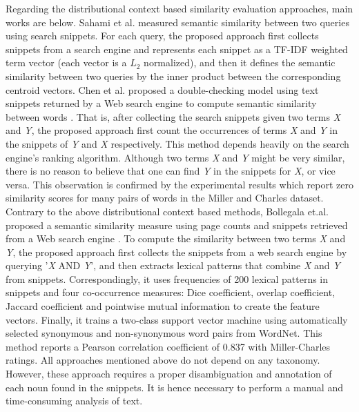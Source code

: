 Regarding the distributional context based similarity evaluation approaches, main works are below. Sahami et al. measured semantic similarity between
two queries using search snippets\cite{Sahami:2006}. For each query, the proposed approach first collects snippets from
a search engine and represents each snippet as a TF-IDF weighted term vector (each vector is a $L_{2}$ normalized), and then it defines the semantic
similarity between two queries by the inner product between the corresponding centroid vectors.
Chen et al. proposed a double-checking model using
text snippets returned by a Web search engine to compute
semantic similarity between words \cite{Chen:2006}. That is, after collecting the search snippets given two terms \emph{X} and \emph{Y},
the proposed approach first count the occurrences of terms \emph{X} and \emph{Y} in the
snippets of \emph{Y} and \emph{X} respectively. {\color{red}This method
depends heavily on the search engine's ranking algorithm.
Although two terms \emph{X} and \emph{Y} might be very similar, there
is no reason to believe that one can find \emph{Y} in the snippets for
\emph{X}, or vice versa. This observation is confirmed by the experimental results which report zero similarity
scores for many pairs of words in the Miller and Charles dataset\cite{Miller:1998}.}
Contrary to the above distributional context based methods, Bollegala et.al. proposed a semantic similarity measure using
page counts and snippets retrieved from a Web
search engine \cite{Bollegala:2007}\cite{Bollegala:2011}. To compute the similarity between
two terms \emph{X} and \emph{Y}, the proposed approach first collects the snippets from a web search engine by querying '\emph{X} AND \emph{Y}', and then extracts lexical
patterns that combine \emph{X} and \emph{Y} from snippets. Correspondingly, it uses frequencies of 200 lexical patterns in snippets and four
co-occurrence measures: Dice coefficient, overlap
coefficient, Jaccard coefficient and pointwise mutual
information to create the feature vectors. Finally, it trains a two-class support
vector machine using automatically selected synonymous
and non-synonymous word pairs from WordNet. This method reports a Pearson correlation
coefficient of 0.837 with Miller-Charles ratings.
{\color{red} All approaches mentioned above do not depend on any taxonomy. However, these approach requires a proper disambiguation and annotation of each noun found in the snippets. It is hence necessary to perform a manual and time-consuming analysis of text.}

